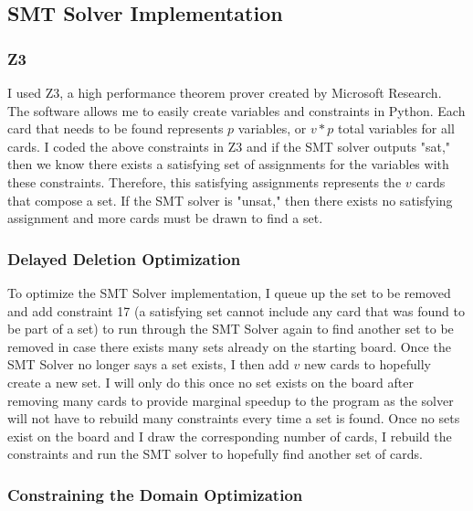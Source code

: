 \documentclass[pageno]{jpaper}
\begin{document}
\subsection{SMT Solver Implementation}


\subsubsection{Z3}
I used Z3, a high performance theorem prover created by Microsoft Research. The software allows me to easily create variables and constraints in Python. Each card that needs to be found represents $p$ variables, or $v*p$ total variables for all cards. I coded the above constraints in Z3 and if the SMT solver outputs "sat," then we know there exists a satisfying set of assignments for the variables with these constraints. Therefore, this satisfying assignments represents the $v$ cards that compose a set. If the SMT solver is "unsat," then there exists no satisfying assignment and more cards must be drawn to find a set. 

\subsubsection{Delayed Deletion Optimization}

To optimize the SMT Solver implementation, I queue up the set to be removed and add constraint 17 (a satisfying set cannot include any card that was found to be part of a set) to run through the SMT Solver again to find another set to be removed in case there exists many sets already on the starting board. Once the SMT Solver no longer says a set exists, I then add $v$ new cards to hopefully create a new set. I will only do this once no set exists on the board after removing many cards to provide marginal speedup to the program as the solver will not have to rebuild many constraints every time a set is found. Once no sets exist on the board and I draw the corresponding number of cards, I rebuild the constraints and run the SMT solver to hopefully find another set of cards. 


\subsubsection{Constraining the Domain Optimization}
\end{document}
